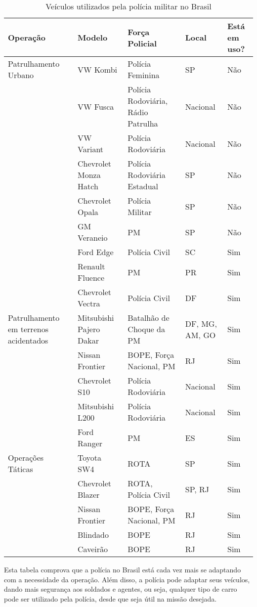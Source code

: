 \begin{table}[H]
\centering
\begin{tabular}{|p{3cm}|p{3cm}|p{3cm}|p{2cm}|p{1cm}|}
\hline
\textbf{Operação} & \textbf{Modelo} & \textbf{Força Policial} & \textbf{Local} & \textbf{Está em uso?} \\ \hline
Patrulhamento Urbano & VW Kombi & Polícia Feminina & SP & Não \\ \hline
 & VW Fusca & Polícia Rodoviária, Rádio Patrulha & Nacional & Não \\ \hline
 & VW Variant & Polícia Rodoviária & Nacional & Não \\ \hline
 & Chevrolet Monza Hatch & Polícia Rodoviária Estadual & SP & Não \\ \hline
 & Chevrolet Opala & Polícia Militar & SP & Não \\ \hline
 & GM Veraneio & PM & SP & Não \\ \hline
 & Ford Edge & Polícia Civil & SC & Sim \\ \hline
 & Renault Fluence & PM & PR & Sim \\ \hline
 & Chevrolet Vectra & Polícia Civil & DF & Sim \\ \hline
Patrulhamento em terrenos acidentados & Mitsubishi Pajero Dakar & Batalhão de Choque da PM & DF, MG, AM, GO & Sim \\ \hline
 & Nissan Frontier & BOPE, Força Nacional, PM & RJ & Sim \\ \hline
 & Chevrolet S10 & Polícia Rodoviária & Nacional & Sim \\ \hline
 & Mitsubishi L200 & Polícia Rodoviária & Nacional & Sim \\ \hline
 & Ford Ranger & PM & ES & Sim \\ \hline
Operações Táticas & Toyota SW4 & ROTA & SP & Sim \\ \hline
 & Chevrolet Blazer & ROTA, Polícia Civil & SP, RJ & Sim \\ \hline
 & Nissan Frontier & BOPE, Força Nacional, PM & RJ & Sim \\ \hline
 & Blindado & BOPE & RJ & Sim \\ \hline
 & Caveirão & BOPE & RJ & Sim \\ \hline
\end{tabular}
\caption{Veículos utilizados pela polícia militar no Brasil\cite{frotas2013}}
\end{table}

Esta tabela comprova que a polícia no Brasil está cada vez mais se adaptando com a necessidade da operação. Além disso, a polícia pode adaptar seus veículos, dando mais segurança aos soldados e agentes, ou seja, qualquer tipo de carro pode ser utilizado pela polícia, desde que seja útil na missão desejada.\cite{frotas2013}

